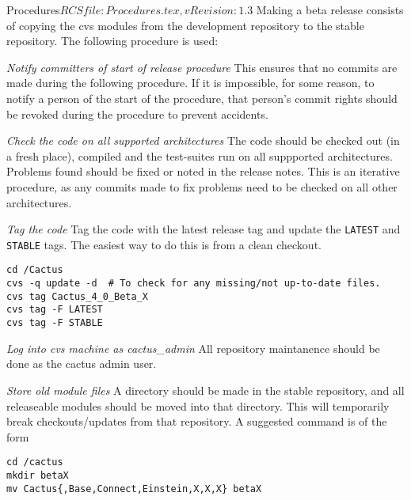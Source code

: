 \begin{cactuspart}{2}{Procedures}{$RCSfile: Procedures.tex,v $}{$Revision: 1.3 $}
Making a beta release consists of copying the cvs modules from the
development repository to the stable repository.  The following
procedure is used:

\begin{Lentry}
\item[{\em Notify committers of start of release procedure}]
This ensures that no commits are made during the following procedure.
If it is impossible, for some reason, to notify a person of the start
of the procedure, that person's commit rights should be revoked during 
the procedure to prevent accidents.
\item[{\em Check the code on all supported architectures}]
The code should be checked out (in a fresh place), compiled and the
test-suites run on all suppported architectures.  Problems found
should be fixed or noted in the release notes.  This is an iterative
procedure, as any commits made to fix problems need to be checked on
all other architectures.
\item[{\em Tag the code}]
Tag the code with the latest release tag and update the {\tt LATEST}
and {\tt STABLE} tags.  The easiest way to do this is from a clean
checkout.
\begin{verbatim}
cd /Cactus
cvs -q update -d  # To check for any missing/not up-to-date files.
cvs tag Cactus_4_0_Beta_X
cvs tag -F LATEST
cvs tag -F STABLE
\end{verbatim}

\item[{\em Log into cvs machine as cactus\_admin}]
All repository maintanence should be done as the cactus admin user.
\item[{\em Store old module files}]
A directory should be made in the stable repository, and all
releaseable modules should be moved into that directory.  This will
temporarily break checkouts/updates from that repository.  A suggested 
command is of the form

\begin{verbatim}
cd /cactus
mkdir betaX
mv Cactus{,Base,Connect,Einstein,X,X,X} betaX
\end{verbatim}


\end{Lentry}
\end{cactuspart}

